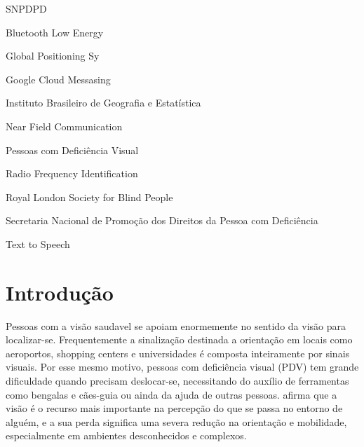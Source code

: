 \documentclass[english,brazilian]{UNISINOSmonografia}
\begin{document}
\begin{listadesiglas}{SNPDPD}
\item[BLE] Bluetooth Low Energy
\item[GPS] Global Positioning Sy
\item[GCM] Google Cloud Messasing
\item[IBGE] Instituto Brasileiro de Geografia e Estatística
\item[NFC] Near Field Communication
\item[PDV] Pessoas com Deficiência Visual
\item[RFID] Radio Frequency Identification
\item[RLSB]	Royal London Society for Blind People
\item[SNPDPD] Secretaria Nacional de Promoção dos Direitos da Pessoa com Deficiência
\item[TTS] Text to Speech
\end{listadesiglas}

\tableofcontents

\chapter{Introdução} %
Pessoas com a visão saudavel se apoiam enormemente no sentido da visão para localizar-se. Frequentemente a sinalização destinada a orientação em locais como aeroportos, shopping centers e universidades é composta inteiramente por sinais visuais. Por esse mesmo motivo, pessoas com deficiência visual (PDV) tem grande dificuldade quando precisam deslocar-se, necessitando do auxílio de ferramentas como bengalas e cães-guia ou ainda da ajuda de outras pessoas.  afirma que a visão é o recurso mais importante na percepção do que se passa no entorno de alguém, e a sua perda significa uma severa redução na orientação e mobilidade, especialmente em ambientes desconhecidos e complexos.
\end{document}
